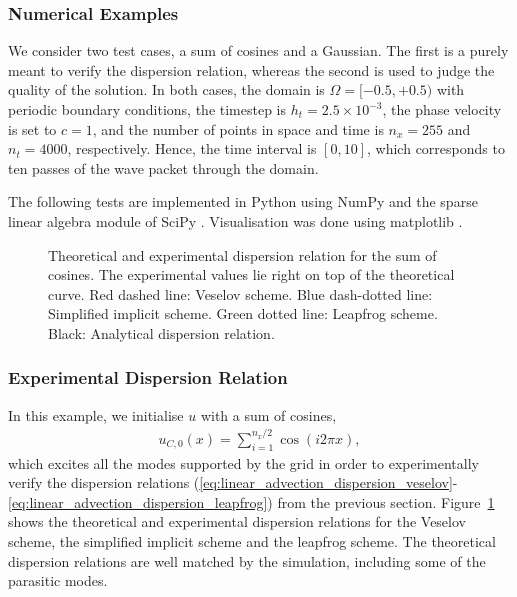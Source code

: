 \documentclass[12pt,a4paper,reqno]{article}
\begin{document}
\subsubsection{Numerical Examples}

We consider two test cases, a sum of cosines and a Gaussian. The first is a purely meant to verify the dispersion relation, whereas the second is used to judge the quality of the solution.
In both cases, the domain is $\Omega = [-0.5, +0.5)$ with periodic boundary conditions, the timestep is $h_t = 2.5 \times 10^{-3}$, the phase velocity is set to $c=1$, and the number of points in space and time is $n_x = 255$ and $n_t = 4000$, respectively. Hence, the time interval is $[0,10]$, which corresponds to ten passes of the wave packet through the domain.

The following tests are implemented in Python \cite{Python, Langtangen:2014} using NumPy \cite{vanDerWalt:2011} and the sparse linear algebra module of SciPy \cite{SciPy}. Visualisation was done using matplotlib \cite{Matplotlib, Hunter:2007}.

\begin{figure}[htb]
	\centering
	\caption{Theoretical and experimental dispersion relation for the sum of cosines. The experimental values lie right on top of the theoretical curve. Red dashed line: Veselov scheme. Blue dash-dotted line: Simplified implicit scheme. Green dotted line: Leapfrog scheme. Black: Analytical dispersion relation.}
	\label{fig:linear_advection_cosines_dispersion}
\end{figure}

\subsubsection*{Experimental Dispersion Relation}

In this example, we initialise $u$ with a sum of cosines,
\begin{align}
u_{C,0} (x) = \sum \limits_{i=1}^{n_x/2} \cos (i 2 \pi x) ,
\end{align}
which excites all the modes supported by the grid in order to experimentally verify the dispersion relations (\ref{eq:linear_advection_dispersion_veselov}-\ref{eq:linear_advection_dispersion_leapfrog}) from the previous section.
Figure~\ref{fig:linear_advection_cosines_dispersion} shows the theoretical and experimental dispersion relations for the Veselov scheme, the simplified implicit scheme and the leapfrog scheme. The theoretical dispersion relations are well matched by the simulation, including some of the parasitic modes.
\end{document}
